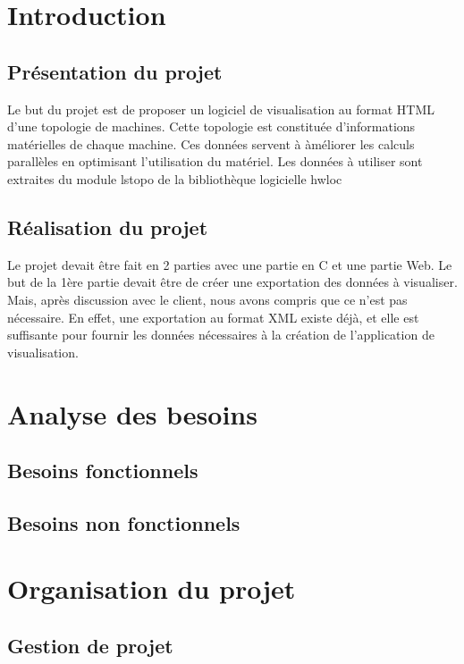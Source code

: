 \documentclass [a4paper,11pt]{article}
\begin{document}
\tableofcontents

\newpage

\section{Introduction}

\subsection{Présentation du projet}
Le but du projet est de proposer un logiciel de visualisation au format HTML d'une topologie de machines. Cette topologie est constituée d'informations matérielles de chaque machine. Ces données servent à àméliorer les calculs parallèles en optimisant l'utilisation du matériel. Les données à utiliser sont extraites du module lstopo de la bibliothèque logicielle hwloc

\subsection{Réalisation du projet}
Le projet devait être fait en 2 parties avec une partie en C et une partie Web. Le but de la 1ère partie devait être de créer une exportation des données à visualiser. Mais, après discussion avec le client, nous avons compris que ce n'est pas nécessaire. En effet, une exportation au format XML existe déjà, et elle est suffisante pour fournir les données nécessaires à la création de l'application de visualisation.

\newpage
\section{Analyse des besoins}

\subsection{Besoins fonctionnels}

\subsection{Besoins non fonctionnels}

\section{Organisation du projet}

\subsection{Gestion de projet}
\end{document}
